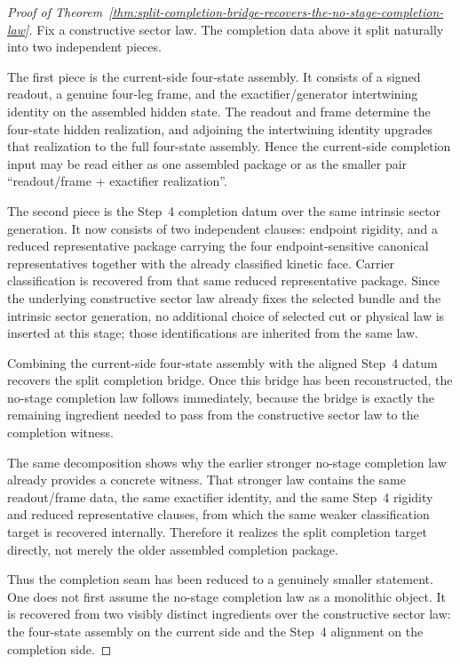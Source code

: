 \begin{proof}[Proof of Theorem~\ref{thm:split-completion-bridge-recovers-the-no-stage-completion-law}]
\label{proof:thm:split-completion-bridge-recovers-the-no-stage-completion-law}
Fix a constructive sector law. The completion data above it split naturally
into two independent pieces.

The first piece is the current-side four-state assembly. It consists of a
signed readout, a genuine four-leg frame, and the exactifier/generator
intertwining identity on the assembled hidden state. The readout and frame
determine the four-state hidden realization, and adjoining the intertwining
identity upgrades that realization to the full four-state assembly. Hence the
current-side completion input may be read either as one assembled package or as
the smaller pair ``readout/frame + exactifier realization''.

The second piece is the Step~4 completion datum over the same intrinsic sector
generation. It now consists of two independent clauses: endpoint rigidity, and
a reduced representative package carrying the four endpoint-sensitive canonical
representatives together with the already classified kinetic face. Carrier
classification is recovered from that same reduced representative package.
Since the underlying constructive sector law already fixes the selected bundle
and the intrinsic sector generation, no additional choice of selected cut or
physical law is inserted at this stage; those identifications are inherited
from the same law.

Combining the current-side four-state assembly with the aligned Step~4 datum
recovers the split completion bridge. Once this bridge has been reconstructed,
the no-stage completion law follows immediately, because the bridge is exactly
the remaining ingredient needed to pass from the constructive sector law to the
completion witness.

The same decomposition shows why the earlier stronger no-stage completion law
already provides a concrete witness. That stronger law contains the same
readout/frame data, the same exactifier identity, and the same Step~4
rigidity and reduced representative clauses, from which the same weaker
classification target is recovered internally. Therefore it realizes the split
completion target directly, not merely the older assembled completion package.

Thus the completion seam has been reduced to a genuinely smaller statement.
One does not first assume the no-stage completion law as a monolithic object.
It is recovered from two visibly distinct ingredients over the constructive
sector law: the four-state assembly on the current side and the Step~4
alignment on the completion side.
\end{proof}


